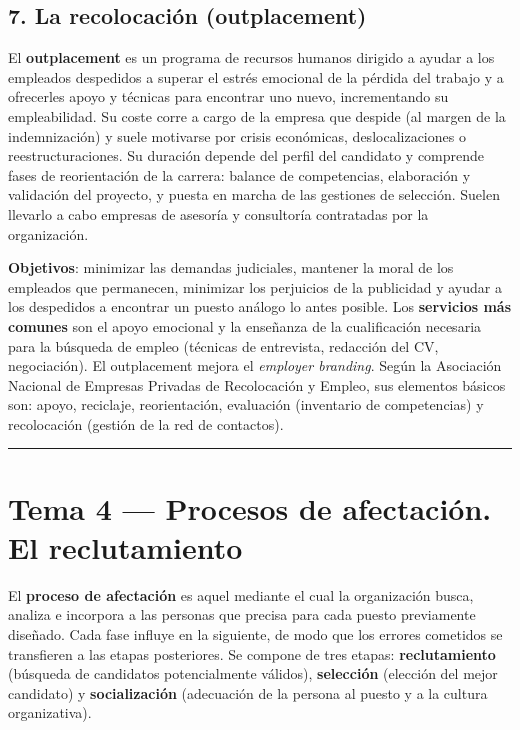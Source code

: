 \documentclass[12pt]{book} %
\begin{document}
\hypertarget{la-recolocaciuxf3n-outplacement}{%
\section{7. La recolocación
(outplacement)}\label{la-recolocaciuxf3n-outplacement}}

El \textbf{outplacement} es un programa de recursos humanos dirigido a
ayudar a los empleados despedidos a superar el estrés emocional de la
pérdida del trabajo y a ofrecerles apoyo y técnicas para encontrar uno
nuevo, incrementando su empleabilidad. Su coste corre a cargo de la
empresa que despide (al margen de la indemnización) y suele motivarse
por crisis económicas, deslocalizaciones o reestructuraciones. Su
duración depende del perfil del candidato y comprende fases de
reorientación de la carrera: balance de competencias, elaboración y
validación del proyecto, y puesta en marcha de las gestiones de
selección. Suelen llevarlo a cabo empresas de asesoría y consultoría
contratadas por la organización.

\textbf{Objetivos}: minimizar las demandas judiciales, mantener la moral
de los empleados que permanecen, minimizar los perjuicios de la
publicidad y ayudar a los despedidos a encontrar un puesto análogo lo
antes posible. Los \textbf{servicios más comunes} son el apoyo emocional
y la enseñanza de la cualificación necesaria para la búsqueda de empleo
(técnicas de entrevista, redacción del CV, negociación). El outplacement
mejora el \emph{employer branding}. Según la Asociación Nacional de
Empresas Privadas de Recolocación y Empleo, sus elementos básicos son:
apoyo, reciclaje, reorientación, evaluación (inventario de competencias)
y recolocación (gestión de la red de contactos).

\begin{center}\rule{0.5\linewidth}{0.5pt}\end{center}

\hypertarget{tema-4-procesos-de-afectaciuxf3n.-el-reclutamiento}{%
\chapter{Tema 4 --- Procesos de afectación. El
reclutamiento}\label{tema-4-procesos-de-afectaciuxf3n.-el-reclutamiento}}

El \textbf{proceso de afectación} es aquel mediante el cual la
organización busca, analiza e incorpora a las personas que precisa para
cada puesto previamente diseñado. Cada fase influye en la siguiente, de
modo que los errores cometidos se transfieren a las etapas posteriores.
Se compone de tres etapas: \textbf{reclutamiento} (búsqueda de
candidatos potencialmente válidos), \textbf{selección} (elección del
mejor candidato) y \textbf{socialización} (adecuación de la persona al
puesto y a la cultura organizativa).
\end{document}
